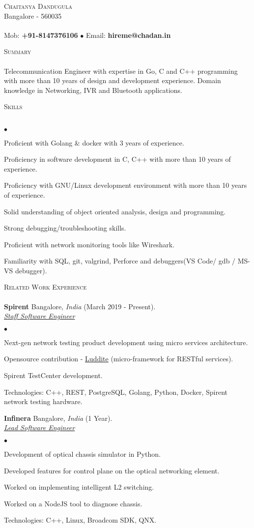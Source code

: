 \documentclass[a4paper]{article}
\newcommand{\lineunder}{\vspace*{-8pt} \\ \hspace*{-18pt} \hrulefill \\}
\newcommand{\header}[1]{{\hspace*{-15pt}\vspace*{6pt} \textsc{#1}} \vspace*{-6pt} \lineunder}
\newcommand{\employer}[4]{{ \textbf{#1} #2  (#3).\\ \underline{\emph{#4}}\\  }}
\newcommand{\contact}[3]{
\vspace*{-8pt}
\begin{center}
{\LARGE \scshape {#1}}\\
#2 \lineunder
#3
\end{center}
\vspace*{-8pt}
}
\newenvironment{achievements}{\begin{list}{$\bullet$}{\topsep 0pt \itemsep -2pt}}{\vspace*{4pt}\end{list}}
\begin{document}
\small
\smallskip
\contact{Chaitanya Dandugula}
{Bangalore - 560035}
{Mob: \textbf{+91-8147376106} $\bullet$ Email: \textbf{hireme@chadan.in}}
\vspace*{5pt}

\header{Summary}
Telecommunication Engineer with expertise in Go, C and C++ programming with more than 10 years of design and development experience.
Domain knowledge in Networking, IVR and Bluetooth applications.

\header{Skills}
\begin{achievements}
\item Proficient with Golang \& docker with 3 years of experience.
\item Proficiency in software development in C, C++ with more than 10 years of experience.
\item Proficiency with GNU/Linux development environment with more than 10 years of experience.
\item Solid understanding of object oriented analysis, design and programming.
\item Strong debugging/troubleshooting skills.
\item Proficient with network monitoring tools like Wireshark.
\item Familiarity with SQL, git, valgrind, Perforce and debuggers(VS Code/ gdb / MS-VS debugger).
\end{achievements}

\header{Related Work Experience}
\employer{Spirent} {Bangalore, \textit{India}} {March 2019 - Present} {Staff Software Engineer}
	\begin{achievements}
          \item Next-gen network testing product development using micro services architecture. 
          \item Opensource contribution - \href{https://github.com/SpirentOrion/luddite.v2}{Luddite} (micro-framework for RESTful services).
          \item Spirent TestCenter development.
          \item Technologies: C++, REST, PostgreSQL, Golang, Python, Docker, Spirent network testing hardware.
	\end{achievements}
\employer{Infinera} {Bangalore, \textit{India}} {1 Year} {Lead Software Engineer}
	\begin{achievements}
          \item Development of optical chassis simulator in Python. 
          \item Developed features for control plane on the optical networking element.
          \item Worked on implementing intelligent L2 switching.
          \item Worked on a NodeJS tool to diagnose chassis.
          \item Technologies: C++, Linux, Broadcom SDK, QNX.
	\end{achievements}
\end{document}
